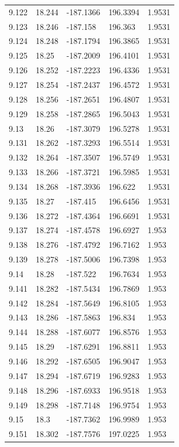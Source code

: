 \begin{tabular}{lllll}
9.122 & 18.244 & -187.1366 & 196.3394 & 1.9531 \\
9.123 & 18.246 & -187.158 & 196.363 & 1.9531 \\
9.124 & 18.248 & -187.1794 & 196.3865 & 1.9531 \\
9.125 & 18.25 & -187.2009 & 196.4101 & 1.9531 \\
9.126 & 18.252 & -187.2223 & 196.4336 & 1.9531 \\
9.127 & 18.254 & -187.2437 & 196.4572 & 1.9531 \\
9.128 & 18.256 & -187.2651 & 196.4807 & 1.9531 \\
9.129 & 18.258 & -187.2865 & 196.5043 & 1.9531 \\
9.13 & 18.26 & -187.3079 & 196.5278 & 1.9531 \\
9.131 & 18.262 & -187.3293 & 196.5514 & 1.9531 \\
9.132 & 18.264 & -187.3507 & 196.5749 & 1.9531 \\
9.133 & 18.266 & -187.3721 & 196.5985 & 1.9531 \\
9.134 & 18.268 & -187.3936 & 196.622 & 1.9531 \\
9.135 & 18.27 & -187.415 & 196.6456 & 1.9531 \\
9.136 & 18.272 & -187.4364 & 196.6691 & 1.9531 \\
9.137 & 18.274 & -187.4578 & 196.6927 & 1.953 \\
9.138 & 18.276 & -187.4792 & 196.7162 & 1.953 \\
9.139 & 18.278 & -187.5006 & 196.7398 & 1.953 \\
9.14 & 18.28 & -187.522 & 196.7634 & 1.953 \\
9.141 & 18.282 & -187.5434 & 196.7869 & 1.953 \\
9.142 & 18.284 & -187.5649 & 196.8105 & 1.953 \\
9.143 & 18.286 & -187.5863 & 196.834 & 1.953 \\
9.144 & 18.288 & -187.6077 & 196.8576 & 1.953 \\
9.145 & 18.29 & -187.6291 & 196.8811 & 1.953 \\
9.146 & 18.292 & -187.6505 & 196.9047 & 1.953 \\
9.147 & 18.294 & -187.6719 & 196.9283 & 1.953 \\
9.148 & 18.296 & -187.6933 & 196.9518 & 1.953 \\
9.149 & 18.298 & -187.7148 & 196.9754 & 1.953 \\
9.15 & 18.3 & -187.7362 & 196.9989 & 1.953 \\
9.151 & 18.302 & -187.7576 & 197.0225 & 1.953 \\

\end{tabular}
